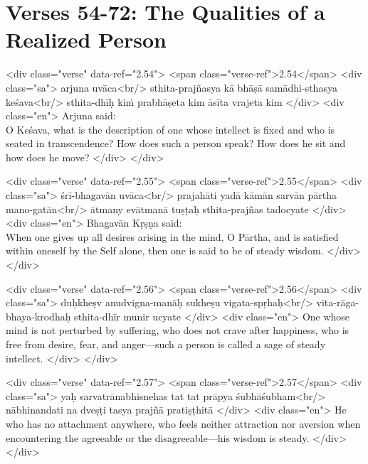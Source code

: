 \section{Verses 54-72: The Qualities of a Realized Person}\label{sec-verses-54-72-the-qualities-of-a-realized-person}


\begin{html}
<div class="verse" data-ref="2.54">
  <span class="verse-ref">2.54</span>
  <div class="sa">
    arjuna uvāca<br/>
    sthita-prajñasya kā bhāṣā samādhi-sthasya keśava<br/>
    sthita-dhīḥ kiṁ prabhāṣeta kim āsīta vrajeta kim
  </div>
  <div class="en">
    \hspace*{1em}Arjuna said: \\ O Keśava, what is the description of one whose intellect is fixed and who is seated in transcendence? How does such a person speak? How does he sit and how does he move?
  </div>
</div>
\end{html}



\begin{html}
<div class="verse" data-ref="2.55">
  <span class="verse-ref">2.55</span>
  <div class="sa">
    śrī-bhagavān uvāca<br/>
    prajahāti yadā kāmān sarvān pārtha mano-gatān<br/>
    ātmany evātmanā tuṣṭaḥ sthita-prajñas tadocyate
  </div>
  <div class="en">
    \hspace*{1em}Bhagavān Kṛṣṇa said: \\ When one gives up all desires arising in the mind, O Pārtha, and is satisfied within oneself by the Self alone, then one is said to be of steady wisdom.
  </div>
</div>
\end{html}



\begin{html}
<div class="verse" data-ref="2.56">
  <span class="verse-ref">2.56</span>
  <div class="sa">
    duḥkheṣv anudvigna-manāḥ sukheṣu vigata-spṛhaḥ<br/>
    vīta-rāga-bhaya-krodhaḥ sthita-dhīr munir ucyate
  </div>
  <div class="en">
    One whose mind is not perturbed by suffering, who does not crave after happiness, who is free from desire, fear, and anger---such a person is called a sage of steady intellect.
  </div>
</div>
\end{html}



\begin{html}
<div class="verse" data-ref="2.57">
  <span class="verse-ref">2.57</span>
  <div class="sa">
    yaḥ sarvatrānabhisnehas tat tat prāpya śubhāśubham<br/>
    nābhinandati na dveṣṭi tasya prajñā pratiṣṭhitā
  </div>
  <div class="en">
    He who has no attachment anywhere, who feels neither attraction nor aversion when encountering the agreeable or the disagreeable---his wisdom is steady.
  </div>
</div>
\end{html}



